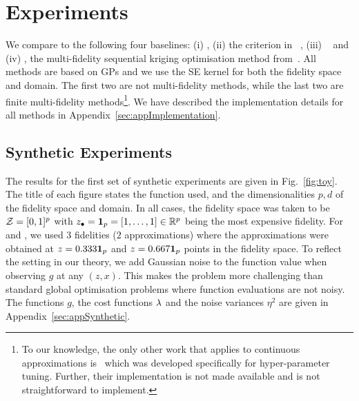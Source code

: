 
\insertToyResultsFigure
\vspace{-0.05in}
\vspace{-0.05in}

\section{Experiments}
\label{sec:experiments}

We compare \bocas to the following four baselines: 
(i) \gpucb,
(ii) the \gpeis criterion in \bayo~\citep{jones98expensive}, 
(iii) \mfgpucbones~\citep{kandasamy16mfbo} and
(iv) \mfsko, the multi-fidelity sequential kriging optimisation method
from~\citet{huang06mfKriging}.
All methods are based on GPs and we use the SE kernel for both the fidelity space
and domain.
The first two are not multi-fidelity methods, while the last two are finite multi-fidelity
methods\footnote{%
To our knowledge, the only other work that applies to continuous approximations
is~\citet{klein2015towards} which was developed specifically for hyper-parameter tuning.
Further, their implementation is not made available and is not straightforward to
implement.  }.
We have described the implementation details for all methods in
Appendix~\ref{sec:appImplementation}.


\subsection{Synthetic Experiments}
\label{sec:synthetic}


The results for the first set of synthetic experiments are given in Fig.~\ref{fig:toy}.
The title of each figure states the function used, and the dimensionalities $p,d$ of the
fidelity space and domain.
In all cases, the fidelity space was taken to be $\mathcal{Z}=[0,1]^p$ with
$z_{\bullet} = {\bf 1}_p = [1,\dots,1]\in\mathbb{R}^p$
being the most expensive fidelity.
For \mfgpucbones and \mfsko, we used $3$ fidelities ($2$ approximations) where the
approximations were obtained at $z=0.333{\bf 1}_p$ and $z=0.667{\bf 1}_p$ points in the fidelity
space.
To reflect the setting in our theory, we add Gaussian noise to the function value
when observing $g$ at any $(z,x)$.
This makes the problem more challenging than standard global optimisation problems
where function evaluations are not noisy.
The functions $g$, the cost functions $\lambda$ and the noise variances $\eta^2$ are given
in Appendix~\ref{sec:appSynthetic}.

